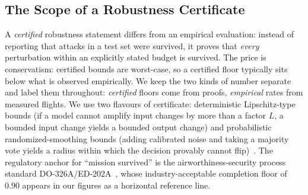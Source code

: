 \subsection{The Scope of a Robustness Certificate}
A \emph{certified} robustness statement differs from an empirical evaluation:
instead of reporting that attacks in a test set were survived, it proves that
\emph{every} perturbation within an explicitly stated budget is survived. The
price is conservatism: certified bounds are worst-case, so a certified floor
typically sits below what is observed empirically. We keep the two kinds of
number separate and label them throughout: \emph{certified} floors come from
proofs, \emph{empirical} rates from measured flights. We use two flavours of
certificate: deterministic Lipschitz-type bounds (if a model cannot amplify
input changes by more than a factor $L$, a bounded input change yields a bounded
output change) and probabilistic randomized-smoothing bounds (adding calibrated
noise and taking a majority vote yields a radius within which the decision
provably cannot flip)~\cite{cohen2019smoothing}. The regulatory anchor for
``mission survived'' is the airworthiness-security process standard
DO-326A/ED-202A~\cite{do326a}, whose industry-acceptable completion floor of
$0.90$ appears in our figures as a horizontal reference line.


